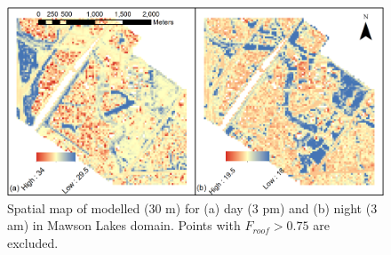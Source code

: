 \documentclass[final,3p,times,authoryear]{elsarticle}
\begin{document}


\begin{figure}[!htbp]

\begin{center}
\end{center}
\includegraphics[width=1\textwidth,keepaspectratio]{figure6.png}
 \caption{Spatial map of modelled  (30 m) for (a) day (3 pm) and (b) night (3 am) in Mawson Lakes domain. Points with $F_{roof} > 0.75$ are excluded. } \label{fig:MawsonModelledTas}
\end{figure}
\end{document}
